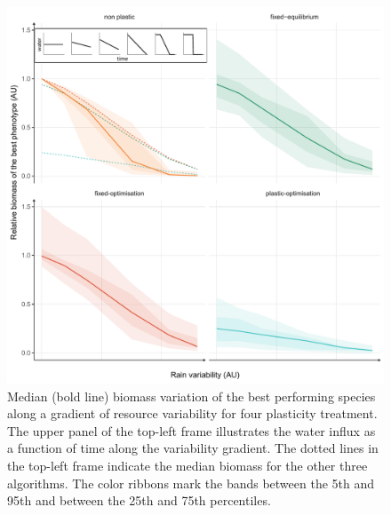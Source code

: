\begin{figure}\label{fig:variable_BM}
\includegraphics[width = \textwidth]{./2_PP/Figures/Variable/var_relnone_BM_trend.pdf}
\caption[Biomass variations along a gradient of resource variability]{Median (bold line) biomass variation of the best performing species along a gradient of resource variability for four plasticity treatment. The upper panel of the top-left frame illustrates the water influx as a function of time along the variability gradient. The dotted lines in the top-left frame indicate the median biomass for the other three algorithms. The color ribbons mark the bands between the 5th and 95th and between the 25th and 75th percentiles. }
\end{figure}

%

